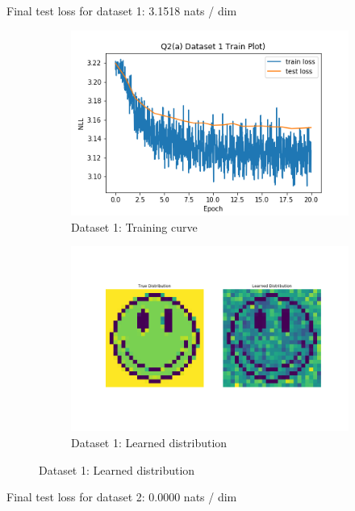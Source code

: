 \documentclass{article}
\begin{document}
\begin{enumerate}[(a)]
Final test loss for dataset 1: 3.1518  nats / dim
\begin{figure}[H]
    \centering
    \begin{subfigure}{0.45\textwidth}
        \centering
        \includegraphics[width=\textwidth]{figures/q2_a_dset1_train_plot.png}
        \caption{Dataset 1: Training curve}
    \end{subfigure}
    \hspace{0.2in}
    \begin{subfigure}{0.45\textwidth}
        \centering
        \includegraphics[width=\textwidth]{figures/q2_a_dset1_learned_dist.png}
        \caption{Dataset 1: Learned distribution}
    \end{subfigure}
\end{figure}
Final test loss for dataset 2: 0.0000  nats / dim
\begin{figure}[H]
    \centering

\end{figure}
\end{enumerate}
\end{document}
